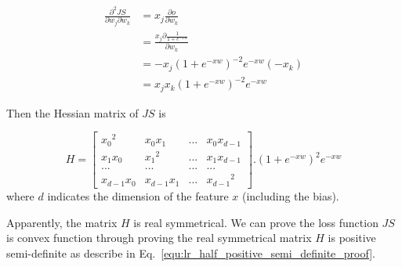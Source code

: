 \documentclass[runningheads,openany]{xhlPaper}
\begin{document}
\begin{equation}
\label{equ:lrSecondOrderDerivation}
\begin{aligned}
\frac{{{\partial ^2}JS}}{{\partial {w_j}\partial {w_k}}} &= {x_j}\frac{{\partial o}}{{\partial {w_k}}}\\
 &= \frac{{{x_j}\partial \frac{1}{{1 + {e^{ - xw}}}}}}{{\partial {w_k}}}\\
 &=  - {x_j}{\left( {1 + {e^{ - xw}}} \right)^{ - 2}}{e^{ - xw}}\left( { - {x_k}} \right)\\
 &= {x_j}{x_k}{\left( {1 + {e^{ - xw}}} \right)^{ - 2}}{e^{ - xw}}
\end{aligned}
\end{equation}

Then the Hessian matrix of $JS$ is 

\begin{displaymath}
\label{equ:lr_hessian_matrix_loss}
H = \left[ {\begin{array}{*{20}{c}}
{{x_0}^2}&{{x_0}{x_1}}&{...}&{{x_0}{x_{d - 1}}}\\
{{x_1}{x_0}}&{{x_1}^2}&{...}&{{x_1}{x_{d - 1}}}\\
{...}&{...}&{...}&{...}\\
{{x_{d - 1}}{x_0}}&{{x_{d - 1}}{x_1}}&{...}&{{x_{d - 1}}^2}
\end{array}} \right].{\left( {1 + {e^{ - xw}}} \right)^2}{e^{ - xw}}
\end{displaymath}
where $d$ indicates the dimension of the feature $x$ (including the bias).

Apparently, the matrix $H$ is real symmetrical. We can prove the loss function $JS$ is convex function through proving the real symmetrical matrix $H$ is positive semi-definite as describe in Eq.~\ref{equ:lr_half_positive_semi_definite_proof}.
\end{document}
